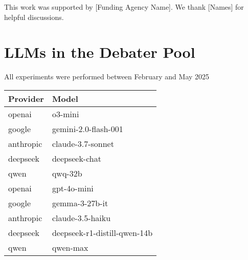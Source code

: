 \documentclass{article}
\begin{document}
\begin{ack}


This work was supported by [Funding Agency Name]. We thank [Names] for helpful discussions.
\end{ack}


\appendix

\appendix


\section{LLMs in the Debater Pool}
\label{appendix:llms}
All experiments were performed between February and May 2025
\begin{tabular}{|l|l|}
  \hline
  Provider & Model \\
  \hline
  openai & o3-mini \\
  google & gemini-2.0-flash-001 \\
  anthropic & claude-3.7-sonnet \\
  deepseek & deepseek-chat \\
  qwen & qwq-32b \\
  openai & gpt-4o-mini \\
  google & gemma-3-27b-it \\
  anthropic & claude-3.5-haiku \\
  deepseek & deepseek-r1-distill-qwen-14b \\
  qwen & qwen-max \\
  \hline
  \end{tabular}
\end{document}

